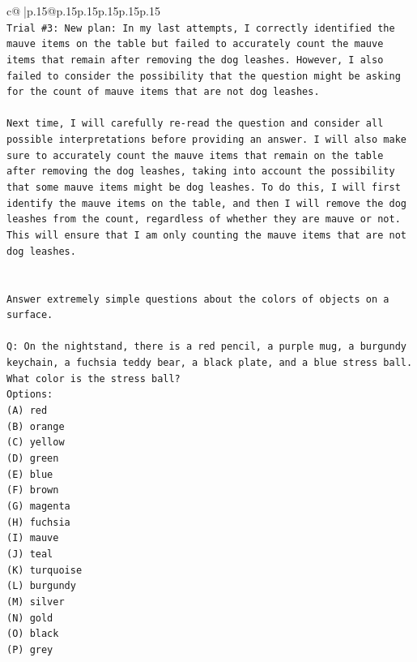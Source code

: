 \documentclass{article}
\begin{document}
{\begin{supertabular}{c@{$\;$}|p{.15\linewidth}@{}p{.15\linewidth}p{.15\linewidth}p{.15\linewidth}p{.15\linewidth}p{.15\linewidth}}
{{{\\ 
\texttt{Trial \#3: New plan: In my last attempts, I correctly identified the mauve items on the table but failed to accurately count the mauve items that remain after removing the dog leashes. However, I also failed to consider the possibility that the question might be asking for the count of mauve items that are not dog leashes. } \\
\\ 
\texttt{Next time, I will carefully re{-}read the question and consider all possible interpretations before providing an answer. I will also make sure to accurately count the mauve items that remain on the table after removing the dog leashes, taking into account the possibility that some mauve items might be dog leashes. To do this, I will first identify the mauve items on the table, and then I will remove the dog leashes from the count, regardless of whether they are mauve or not. This will ensure that I am only counting the mauve items that are not dog leashes.} \\
\\ 
\\ 
\texttt{Answer extremely simple questions about the colors of objects on a surface.} \\
\\ 
\texttt{Q: On the nightstand, there is a red pencil, a purple mug, a burgundy keychain, a fuchsia teddy bear, a black plate, and a blue stress ball. What color is the stress ball?} \\
\texttt{Options:} \\
\texttt{(A) red} \\
\texttt{(B) orange} \\
\texttt{(C) yellow} \\
\texttt{(D) green} \\
\texttt{(E) blue} \\
\texttt{(F) brown} \\
\texttt{(G) magenta} \\
\texttt{(H) fuchsia} \\
\texttt{(I) mauve} \\
\texttt{(J) teal} \\
\texttt{(K) turquoise} \\
\texttt{(L) burgundy} \\
\texttt{(M) silver} \\
\texttt{(N) gold} \\
\texttt{(O) black} \\
\texttt{(P) grey} \\
}}}
\end{supertabular}}
\end{document}
